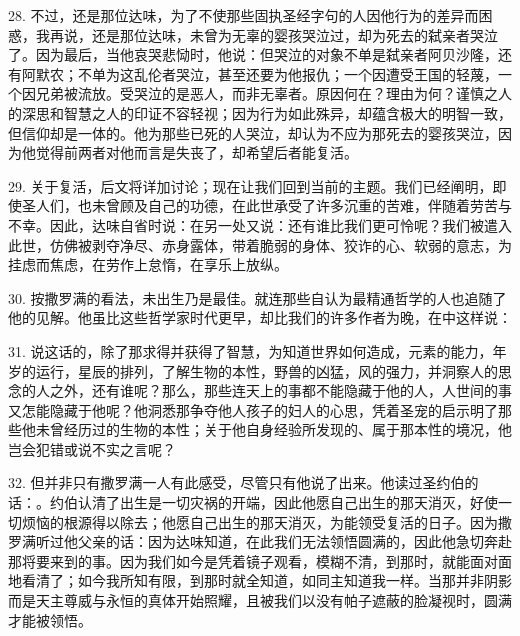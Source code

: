 28. 不过，还是那位达味，为了不使那些固执圣经字句的人因他行为的差异而困惑，我再说，还是那位达味，未曾为无辜的婴孩哭泣过，却为死去的弑亲者哭泣了。因为最后，当他哀哭悲恸时，他说：但哭泣的对象不单是弑亲者阿贝沙隆，还有阿默农；不单为这乱伦者哭泣，甚至还要为他报仇；一个因遭受王国的轻蔑，一个因兄弟被流放。受哭泣的是恶人，而非无辜者。原因何在？理由为何？谨慎之人的深思和智慧之人的印证不容轻视；因为行为如此殊异，却蕴含极大的明智一致，但信仰却是一体的。他为那些已死的人哭泣，却认为不应为那死去的婴孩哭泣，因为他觉得前两者对他而言是失丧了，却希望后者能复活。\par

29. 关于复活，后文将详加讨论；现在让我们回到当前的主题。我们已经阐明，即使圣人们，也未曾顾及自己的功德，在此世承受了许多沉重的苦难，伴随着劳苦与不幸。因此，达味自省时说：在另一处又说：还有谁比我们更可怜呢？我们被遣入此世，仿佛被剥夺净尽、赤身露体，带着脆弱的身体、狡诈的心、软弱的意志，为挂虑而焦虑，在劳作上怠惰，在享乐上放纵。\par

30. 按撒罗满的看法，未出生乃是最佳。就连那些自认为最精通哲学的人也追随了他的见解。他虽比这些哲学家时代更早，却比我们的许多作者为晚，在中这样说：\par

31. 说这话的，除了那求得并获得了智慧，为知道世界如何造成，元素的能力，年岁的运行，星辰的排列，了解生物的本性，野兽的凶猛，风的强力，并洞察人的思念的人之外，还有谁呢？那么，那些连天上的事都不能隐藏于他的人，人世间的事又怎能隐藏于他呢？他洞悉那争夺他人孩子的妇人的心思，凭着圣宠的启示明了那些他未曾经历过的生物的本性；关于他自身经验所发现的、属于那本性的境况，他岂会犯错或说不实之言呢？\par

32. 但并非只有撒罗满一人有此感受，尽管只有他说了出来。他读过圣约伯的话：。约伯认清了出生是一切灾祸的开端，因此他愿自己出生的那天消灭，好使一切烦恼的根源得以除去；他愿自己出生的那天消灭，为能领受复活的日子。因为撒罗满听过他父亲的话：因为达味知道，在此我们无法领悟圆满的，因此他急切奔赴那将要来到的事。因为我们如今是凭着镜子观看，模糊不清，到那时，就能面对面地看清了；如今我所知有限，到那时就全知道，如同主知道我一样。当那并非阴影而是天主尊威与永恒的真体开始照耀，且被我们以没有帕子遮蔽的脸凝视时，圆满才能被领悟。\par

